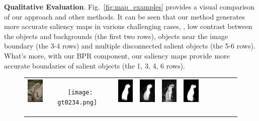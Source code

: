 \documentclass[10pt,twocolumn,letterpaper]{article}
\begin{document}
\textbf{Qualitative Evaluation}. Fig.~\ref{fig:map_examples} provides a visual comparison of our approach and other methods.
%
It can be seen that our method generates more accurate saliency maps in various challenging cases, \eg, low contrast between the objects and backgrounds (the first two rows), objects near the image boundary (the 3-4 rows) and multiple disconnected salient objects (the 5-6 rows). What's more, with our BPR component, our saliency maps provide more accurate boundaries of salient objects (the 1, 3, 4, 6 rows).
\begin{figure}
\centering
\begin{tabular}{@{}c@{}c@{}c@{}c@{}c@{}c@{}c@{}c@{}c@{}c@{}c}
\vspace{-1mm}
\includegraphics[width=0.085\linewidth,height=1.25cm]{0234.jpg} \ &
\texttt{[image: gt0234.png]} \ &
\includegraphics[width=0.085\linewidth,height=1.25cm]{0234_Amulet.png} \ &
\includegraphics[width=0.085\linewidth,height=1.25cm]{0234_RFCN.jpg} \ &
\includegraphics[width=0.085\linewidth,height=1.25cm]{0234_DCL.png} \ &
\includegraphics[width=0.085\linewidth,height=1.25cm]{0234_DHS.png} \ &

\end{tabular}
\end{figure}
\end{document}
